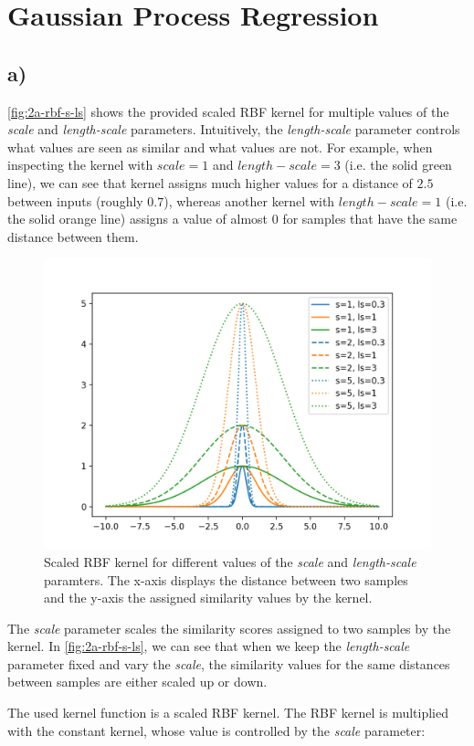 \documentclass[11pt]{article}
\begin{document}
\section{Gaussian Process Regression}\label{sec:gpr}

\subsection{a)}\label{subsec:gpr-a}

\autoref{fig:2a-rbf-s-ls} shows the provided scaled RBF kernel for multiple values of the \textit{scale} and \textit{length-scale} parameters. Intuitively, the \textit{length-scale} parameter controls what values are seen as similar and what values are not. For example, when inspecting the kernel with $scale=1$ and $length-scale=3$ (i.e. the solid green line), we can see that kernel assigns much higher values for a distance of $2.5$ between inputs (roughly $0.7$), whereas another kernel with $length-scale=1$ (i.e. the solid orange line) assigns a value of almost $0$ for samples that have the same distance between them. 

\begin{figure}[H]
  	\center
  	\includegraphics[width=.5\columnwidth]{assets/2a-rbf-s-ls}
  	\caption{Scaled RBF kernel for different values of the \textit{scale} and \textit{length-scale} paramters. The x-axis displays the distance between two samples and the y-axis the assigned similarity values by the kernel.}
  	\label{fig:2a-rbf-s-ls}
\end{figure}


\noindent The \textit{scale} parameter scales the similarity scores assigned to two samples by the kernel. In \autoref{fig:2a-rbf-s-ls}, we can see that when we keep the \textit{length-scale} parameter fixed and vary the \textit{scale}, the similarity values for the same distances between samples are either scaled up or down.

The used kernel function is a scaled RBF kernel. The RBF kernel is multiplied with the constant kernel, whose value is controlled by the \textit{scale} parameter:
\end{document}
